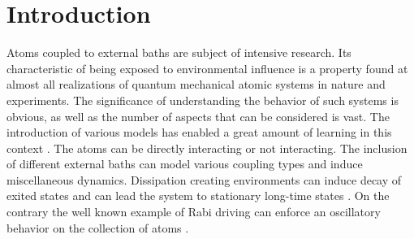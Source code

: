 \chapter{Introduction}
Atoms coupled to external baths are subject of intensive research. Its characteristic of being exposed to environmental influence is a property found at almost all realizations of quantum mechanical atomic systems in nature and experiments. The significance of understanding the behavior of such systems is obvious, as well as the number of aspects that can be considered is vast. The introduction of various models has enabled a great amount of learning in this context \cite{diehl_quantum_2008,diehl_dynamical_2010,cabot_metastable_2022,mattes_entangled_2023,krishna_measurement-induced_2023,jin_photon_2013,marcuzzi_absorbing_2016}. The atoms can be directly interacting or not interacting. The inclusion of different external baths can model various coupling types and induce miscellaneous dynamics. Dissipation creating environments can induce decay of exited states and can lead the system to stationary long-time states \cite{camalet_non-equilibrium_2011,huangfu_steady_2018}. On the contrary the well known example of Rabi driving \cite{rabi_space_1937} can enforce an oscillatory behavior on the collection of atoms \cite{dudin_observation_2012}.

